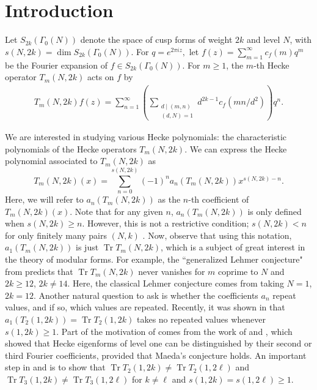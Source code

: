 \documentclass[11pt,letterpaper,reqno]{amsart}
\numberwithin{figure}{section}
\numberwithin{table}{section}
\theoremstyle{definition}
\theoremstyle{plain}
\theoremstyle{definition}
\theoremstyle{definition}
\theoremstyle{remark}
\numberwithin{equation}{section}
\DeclareMathOperator{\Tr}{Tr}
\begin{document}
\section{Introduction}

Let $S_{2k}(\Gamma_0(N))$ \cite[Section 3.1]{serrehecke} denote the space of cusp forms of weight $2k$ and level $N$, with $s(N, 2k)=\dim S_{2k}(\Gamma_0(N))$. 
For $q=e^{2\pi iz},$ let $f(z)=\sum_{m=1}^{\infty}c_f(m) q^m$ be the Fourier expansion of $f\in S_{2k}(\Gamma_0(N))$. For $m \geq 1$, the $m$-th Hecke operator $T_m(N, 2k)$ \cite[Proposition 10.2.5]{cohen-stromberg} acts on $f$ by 
\begin{align}
T_m(N, 2k) f(z)=\sum_{n=1}^{\infty}\left(\sum_{\substack{d\mid (m,n)\\ (d,N)=1}}d^{2k-1} c_f(mn/d^2)\right)q^n.
\end{align}

We are interested in studying various Hecke polynomials: the characteristic polynomials of the Hecke operators $T_m(N, 2k)$. We can express the Hecke polynomial associated to $T_m(N, 2k)$ as
$$T_m(N,2k)(x)=\sum_{n=0}^{s(N,2k)} (-1)^n a_n(T_m(N, 2k)) x^{s(N,2k)-n}.$$
Here, we will refer to $a_n(T_m(N, 2k))$ as the $n$-th coefficient of $T_m(N, 2k)(x)$. Note that for any given $n$, $a_n(T_m(N, 2k))$ is only defined when $s(N, 2k) \geq n$. However, this is not a restrictive condition; $s(N, 2k) < n$ for only finitely many pairs $(N,k)$ \cite[Theorem 1.1]{ross}. Now, observe that using this notation, $a_1(T_m(N, 2k))$ is just $\Tr T_m(N, 2k)$, which is a subject of great interest in the theory of modular forms. For example, the ``generalized Lehmer conjecture" from \cite[Conjecture 1.5]{rouse} predicts that  $\Tr T_m(N, 2k)$ never vanishes for $m$ coprime to $N$ and $2k \geq 12$, $2k \neq 14$. Here, the classical Lehmer conjecture comes from taking $N=1$, $2k=12$.
Another natural question to ask is whether the coefficients $a_n$ repeat values, and if so, which values are repeated. Recently, it was shown in \cite{chirjorznorepeat} that $a_1(T_2(1, 2k)) = \Tr T_2(1, 2k)$ takes no repeated values whenever $s(1, 2k) \geq 1$. Part of the motivation of \cite{chirjorznorepeat} comes from the work of \cite{Vilardi2018} and \cite{xue-zhu}, which showed that Hecke eigenforms of level one can be distinguished by their second or third Fourier coefficients, provided that Maeda's conjecture holds.  An important step in \cite{Vilardi2018} and \cite{xue-zhu} is to show that  $\Tr T_2(1,2k) \ne \Tr T_2(1,2\ell)$ and $\Tr T_3(1,2k)\ne \Tr T_3(1,2\ell)$ for $k\ne \ell$ and $s(1,2k)=s(1,2\ell)\ge1$. 
\end{document}

